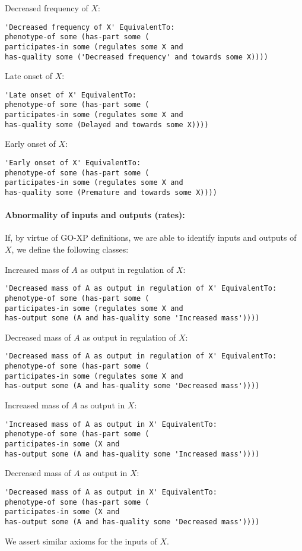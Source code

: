 \documentclass{article}
\begin{document}
Decreased frequency of $X$:
\begin{verbatim}
'Decreased frequency of X' EquivalentTo:
phenotype-of some (has-part some (
participates-in some (regulates some X and
has-quality some ('Decreased frequency' and towards some X))))
\end{verbatim}

Late onset of $X$:
\begin{verbatim}
'Late onset of X' EquivalentTo:
phenotype-of some (has-part some (
participates-in some (regulates some X and
has-quality some (Delayed and towards some X))))
\end{verbatim}

Early onset of $X$:
\begin{verbatim}
'Early onset of X' EquivalentTo:
phenotype-of some (has-part some (
participates-in some (regulates some X and
has-quality some (Premature and towards some X))))
\end{verbatim}

\paragraph{Abnormality of inputs and outputs (rates):}
If, by virtue of GO-XP definitions, we are able to identify inputs and
outputs of $X$, we define the following classes:

Increased mass of $A$ as output in regulation of $X$:
\begin{verbatim}
'Decreased mass of A as output in regulation of X' EquivalentTo:
phenotype-of some (has-part some (
participates-in some (regulates some X and
has-output some (A and has-quality some 'Increased mass'))))
\end{verbatim}

Decreased mass of $A$ as output in regulation of $X$:
\begin{verbatim}
'Decreased mass of A as output in regulation of X' EquivalentTo:
phenotype-of some (has-part some (
participates-in some (regulates some X and
has-output some (A and has-quality some 'Decreased mass'))))
\end{verbatim}

Increased mass of $A$ as output in $X$:
\begin{verbatim}
'Increased mass of A as output in X' EquivalentTo:
phenotype-of some (has-part some (
participates-in some (X and
has-output some (A and has-quality some 'Increased mass'))))
\end{verbatim}

Decreased mass of $A$ as output in $X$:
\begin{verbatim}
'Decreased mass of A as output in X' EquivalentTo:
phenotype-of some (has-part some (
participates-in some (X and
has-output some (A and has-quality some 'Decreased mass'))))
\end{verbatim}

We assert similar axioms for the inputs of $X$.



\end{document}
